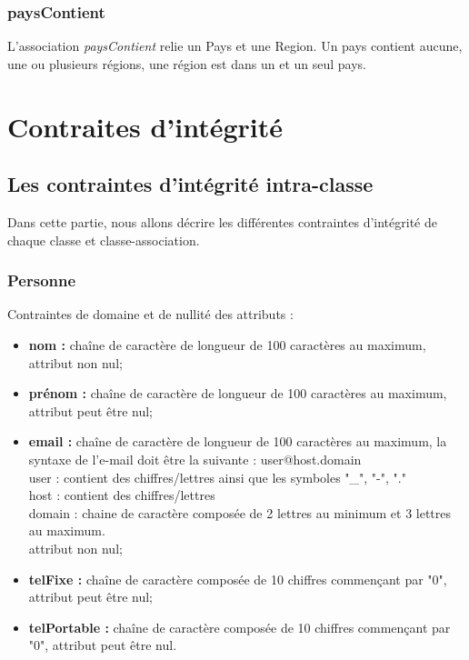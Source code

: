 \documentclass[asi, sansVersion]{picInsa}
\begin{document}
\subsection*{paysContient}

L'association \textit{paysContient} relie un Pays et une Region. Un pays contient aucune, une ou plusieurs régions, une région est dans un et un seul pays.

\chapter{Contraites d'intégrité}

\section{Les contraintes d'intégrité intra-classe}
Dans cette partie, nous allons décrire les différentes contraintes d'intégrité de chaque classe et classe-association.
 
\subsection*{Personne}
Contraintes de domaine et de nullité des attributs :
\begin{itemize}
 	\item \textbf{nom :} chaîne de caractère de longueur de 100 caractères au maximum, attribut non nul;
	\item \textbf{prénom :} chaîne de caractère de longueur de 100 caractères au maximum, attribut peut être nul;
	\item \textbf{email :} chaîne de caractère de longueur de 100 caractères au maximum, la syntaxe de l'e-mail doit être la suivante : user@host.domain\\
	user : contient des chiffres/lettres ainsi que les symboles "\_", "-", "." \\
	host : contient des chiffres/lettres \\
	domain : chaine de caractère composée de 2 lettres au minimum et 3 lettres au maximum. \\
	attribut non nul;  
	\item \textbf{telFixe :} chaîne de caractère composée de 10 chiffres commençant par "0", attribut peut être nul;
	\item \textbf{telPortable :} chaîne de caractère composée de 10 chiffres commençant par "0", attribut peut être nul.\\
\end{itemize}  
\end{document}
